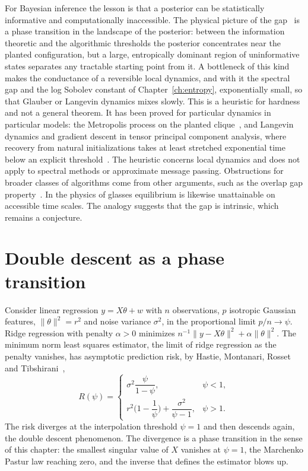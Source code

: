 For Bayesian inference the lesson is that a posterior can be statistically informative and computationally inaccessible. The physical picture of the gap~\cite{zdeborova2016} is a phase transition in the landscape of the posterior: between the information theoretic and the algorithmic thresholds the posterior concentrates near the planted configuration, but a large, entropically dominant region of uninformative states separates any tractable starting point from it. A bottleneck of this kind makes the conductance of a reversible local dynamics, and with it the spectral gap and the log Sobolev constant of Chapter~\ref{ch:entropy}, exponentially small, so that Glauber or Langevin dynamics mixes slowly. This is a heuristic for hardness and not a general theorem. It has been proved for particular dynamics in particular models: the Metropolis process on the planted clique~\cite{jerrum1992}, and Langevin dynamics and gradient descent in tensor principal component analysis, where recovery from natural initializations takes at least stretched exponential time below an explicit threshold~\cite{benarous2020}. The heuristic concerns local dynamics and does not apply to spectral methods or approximate message passing. Obstructions for broader classes of algorithms come from other arguments, such as the overlap gap property~\cite{gamarnik2021}. In the physics of glasses equilibrium is likewise unattainable on accessible time scales. The analogy suggests that the gap is intrinsic, which remains a conjecture.

\section{Double descent as a phase transition}

Consider linear regression $y = X\theta+w$ with $n$ observations, $p$ isotropic Gaussian features, $\|\theta\|^2 = r^2$ and noise variance $\sigma^2$, in the proportional limit $p/n\to\psi$. Ridge regression with penalty $\alpha>0$ minimizes $n^{-1}\|y-X\theta\|^2+\alpha\|\theta\|^2$. The minimum norm least squares estimator, the limit of ridge regression as the penalty vanishes, has asymptotic prediction risk, by Hastie, Montanari, Rosset and Tibshirani~\cite{hmrt2022},
\[
R(\psi) = \begin{cases}\sigma^2\dfrac{\psi}{1-\psi}, & \psi<1,\\[2ex] r^2\Big(1-\dfrac1\psi\Big)+\dfrac{\sigma^2}{\psi-1}, & \psi>1.\end{cases}
\]
The risk diverges at the interpolation threshold $\psi = 1$ and then descends again, the double descent phenomenon. The divergence is a phase transition in the sense of this chapter: the smallest singular value of $X$ vanishes at $\psi = 1$, the Marchenko Pastur law reaching zero, and the inverse that defines the estimator blows up.

